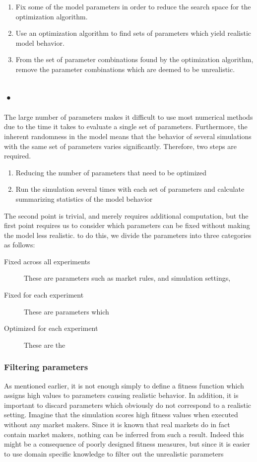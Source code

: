 \begin{enumerate}
\item Fix some of the model parameters in order to reduce the search space for the optimization algorithm.
\item Use an optimization algorithm to find sets of parameters which yield realistic model behavior.
\item From the set of parameter combinations found by the optimization algorithm, remove the parameter combinations which are deemed to be unrealistic.
\end{enumerate}

\subsection{•}
The large number of parameters makes it difficult to use most numerical methods due to the time it takes to evaluate a single set of parameters. Furthermore, the inherent randomness in the model means that the behavior of several simulations with the same set of parameters varies significantly. Therefore, two steps are required.
\begin{enumerate}
\item Reducing the number of parameters that need to be optimized
\item Run the simulation several times with each set of parameters and calculate summarizing statistics of the model behavior
\end{enumerate}
The second point is trivial, and merely requires additional computation, but the first point requires us to consider which parameters can be fixed without making the model less realistic. to do this, we divide the parameters into three categories as follows:
\begin{description}
\item[Fixed across all experiments] These are parameters such as market rules, and simulation settings, 
\item[Fixed for each experiment] These are parameters which 
\item[Optimized for each experiment] These are the 
\end{description}




\subsubsection{Filtering parameters}\label{section:filtering_parameters}
As mentioned earlier, it is not enough simply to define a fitness function which assigns high values to parameters causing realistic behavior. In addition, it is important to discard parameters which obviously do not correspond to a realistic setting. Imagine that the simulation scores high fitness values when executed without any market makers. Since it is known that real markets do in fact contain market makers, nothing can be inferred from such a result. Indeed this might be a consequence of poorly designed fitness measures, but since it is easier to use domain specific knowledge to filter out the unrealistic parameters

